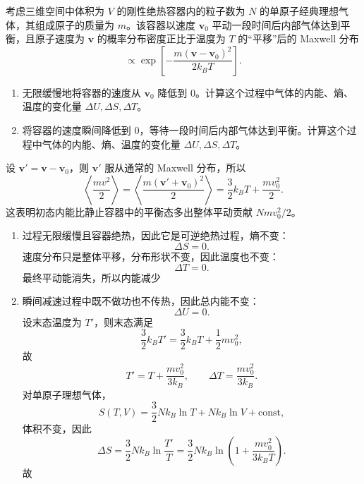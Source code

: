 \begin{question}
考虑三维空间中体积为 $V$ 的刚性绝热容器内的粒子数为 $N$ 的单原子经典理想气体，其组成原子的质量为 $m$。该容器以速度 $\mathbf v_0$ 平动一段时间后内部气体达到平衡，且原子速度为 $\mathbf v$ 的概率分布密度正比于温度为 $T$ 的“平移”后的 Maxwell 分布
\[
\propto \exp\!\left[-\frac{m(\mathbf v-\mathbf v_0)^2}{2k_B T}\right].
\]

\begin{enumerate}[label=(\arabic*),leftmargin=2.5em]
  \item 无限缓慢地将容器的速度从 $\mathbf v_0$ 降低到 $0$。计算这个过程中气体的内能、熵、温度的变化量 $\Delta U,\Delta S,\Delta T$。
  \item 将容器的速度瞬间降低到 $0$，等待一段时间后内部气体达到平衡。计算这个过程中气体的内能、熵、温度的变化量 $\Delta U,\Delta S,\Delta T$。
\end{enumerate}

\begin{solution}
设 $\mathbf v'=\mathbf v-\mathbf v_0$，则 $\mathbf v'$ 服从通常的 Maxwell 分布，所以
\[
\left\langle \frac{m v^2}{2}\right\rangle
=\left\langle \frac{m(\mathbf v'+\mathbf v_0)^2}{2}\right\rangle
=\frac32 k_B T+\frac{m v_0^2}{2}.
\]
这表明初态内能比静止容器中的平衡态多出整体平动贡献 $Nm v_0^2/2$。

\begin{enumerate}[label=(\arabic*),leftmargin=2.5em]
  \item 过程无限缓慢且容器绝热，因此它是可逆绝热过程，熵不变：
  \[
  \Delta S=0.
  \]
  速度分布只是整体平移，分布形状不变，因此温度也不变：
  \[
  \Delta T=0.
  \]
  最终平动能消失，所以内能减少

  \item 瞬间减速过程中既不做功也不传热，因此总内能不变：
  \[
  \Delta U=0.
  \]
  设末态温度为 $T'$，则末态满足
  \[
  \frac32 k_B T'=\frac32 k_B T+\frac12 m v_0^2,
  \]
  故
  \[
  T'=T+\frac{m v_0^2}{3k_B},
  \qquad
  \Delta T=\frac{m v_0^2}{3k_B}.
  \]
  对单原子理想气体，
  \[
  S(T,V)=\frac32 Nk_B\ln T+Nk_B\ln V+\text{const},
  \]
  体积不变，因此
  \[
  \Delta S=\frac32 Nk_B\ln\frac{T'}{T}
  =\frac32 Nk_B\ln\left(1+\frac{m v_0^2}{3k_B T}\right).
  \]
  故
\end{enumerate}
\end{solution}
\end{question}

